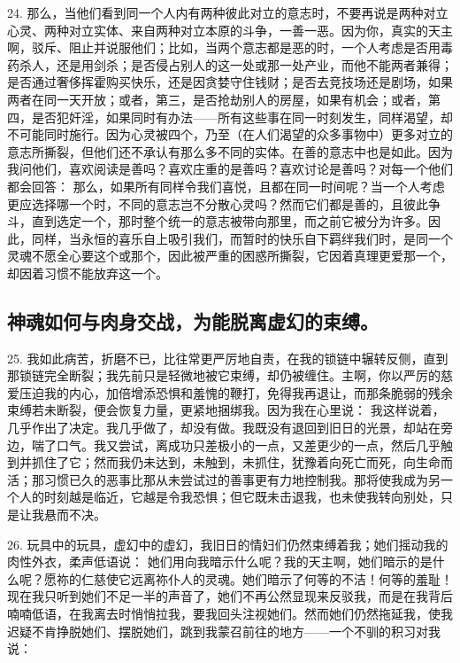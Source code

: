 24. 那么，当他们看到同一个人内有两种彼此对立的意志时，不要再说是两种对立心灵、两种对立实体、来自两种对立本原的斗争，一善一恶。因为你，真实的天主啊，驳斥、阻止并说服他们；比如，当两个意志都是恶的时，一个人考虑是否用毒药杀人，还是用剑杀；是否侵占别人的这一处或那一处产业，而他不能两者兼得；是否通过奢侈挥霍购买快乐，还是因贪婪守住钱财；是否去竞技场还是剧场，如果两者在同一天开放；或者，第三，是否抢劫别人的房屋，如果有机会；或者，第四，是否犯奸淫，如果同时有办法——所有这些事在同一时刻发生，同样渴望，却不可能同时施行。因为心灵被四个，乃至（在人们渴望的众多事物中）更多对立的意志所撕裂，但他们还不承认有那么多不同的实体。在善的意志中也是如此。因为我问他们，喜欢阅读是善吗？喜欢庄重的是善吗？喜欢讨论是善吗？对每一个他们都会回答： 那么，如果所有同样令我们喜悦，且都在同一时间呢？当一个人考虑更应选择哪一个时，不同的意志岂不分散心灵吗？然而它们都是善的，且彼此争斗，直到选定一个，那时整个统一的意志被带向那里，而之前它被分为许多。因此，同样，当永恒的喜乐自上吸引我们，而暂时的快乐自下羁绊我们时，是同一个灵魂不愿全心要这个或那个，因此被严重的困惑所撕裂，它因着真理更爱那一个，却因着习惯不能放弃这一个。\par


\subsection{神魂如何与肉身交战，为能脱离虚幻的束缚。}

25. 我如此病苦，折磨不已，比往常更严厉地自责，在我的锁链中辗转反侧，直到那锁链完全断裂；我先前只是轻微地被它束缚，却仍被缠住。主啊，你以严厉的慈爱压迫我的内心，加倍增添恐惧和羞愧的鞭打，免得我再退让，而那条脆弱的残余束缚若未断裂，便会恢复力量，更紧地捆绑我。因为我在心里说： 我这样说着，几乎作出了决定。我几乎做了，却没有做。我既没有退回到旧日的光景，却站在旁边，喘了口气。我又尝试，离成功只差极小的一点，又差更少的一点，然后几乎触到并抓住了它；然而我仍未达到，未触到，未抓住，犹豫着向死亡而死，向生命而活；那习惯已久的恶事比那从未尝试过的善事更有力地控制我。那将使我成为另一个人的时刻越是临近，它越是令我恐惧；但它既未击退我，也未使我转向别处，只是让我悬而不决。\par

26. 玩具中的玩具，虚幻中的虚幻，我旧日的情妇们仍然束缚着我；她们摇动我的肉性外衣，柔声低语说： 她们用向我暗示什么呢？我的天主啊，她们暗示的是什么呢？愿祢的仁慈使它远离祢仆人的灵魂。她们暗示了何等的不洁！何等的羞耻！现在我只听到她们不足一半的声音了，她们不再公然显现来反驳我，而是在我背后喃喃低语，在我离去时悄悄拉我，要我回头注视她们。然而她们仍然拖延我，使我迟疑不肯挣脱她们、摆脱她们，跳到我蒙召前往的地方——一个不驯的积习对我说：\par

